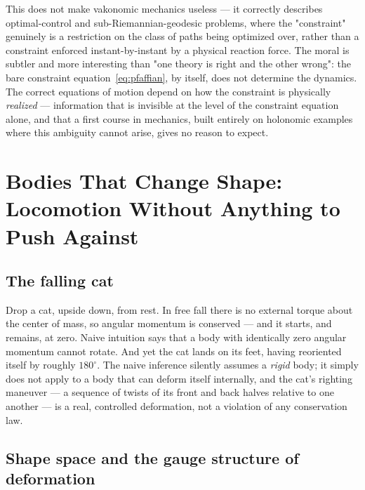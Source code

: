 This does not make vakonomic mechanics useless --- it correctly
describes optimal-control and sub-Riemannian-geodesic problems, where
the "constraint" genuinely is a restriction on the class of paths
being optimized over, rather than a constraint enforced
instant-by-instant by a physical reaction force. The moral is
subtler and more interesting than "one theory is right and the other
wrong": the bare constraint equation~\eqref{eq:pfaffian}, by itself,
does not determine the dynamics. The correct equations of motion
depend on how the constraint is physically \emph{realized} ---
information that is invisible at the level of the constraint
equation alone, and that a first course in mechanics, built entirely
on holonomic examples where this ambiguity cannot arise, gives no
reason to expect.

\section{Bodies That Change Shape: Locomotion Without Anything to
  Push Against}
\label{sec:shape}

\subsection{The falling cat}

Drop a cat, upside down, from rest. In free fall there is no
external torque about the center of mass, so angular momentum is
conserved --- and it starts, and remains, at zero. Naive intuition
says that a body with identically zero angular momentum cannot
rotate. And yet the cat lands on its feet, having reoriented itself
by roughly $180^\circ$. The naive inference silently assumes a
\emph{rigid} body; it simply does not apply to a body that can
deform itself internally, and the cat's righting maneuver --- a
sequence of twists of its front and back halves relative to one
another --- is a real, controlled deformation, not a violation of
any conservation law.

\subsection{Shape space and the gauge structure of deformation}

